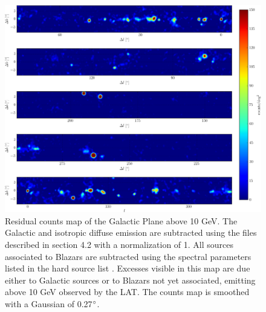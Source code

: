 \begin{figure}[h!]
\centering
\includegraphics[width=\textwidth]{figures/Plan_gal.eps}
\caption{Residual counts map of the Galactic Plane above 10 GeV. The Galactic and isotropic diffuse emission are subtracted using the files described in section 4.2 with a normalization of 1. All sources associated to Blazars are subtracted using the spectral parameters listed in the hard source list \citep{1FHL}. Excesses visible in this map are due either to Galactic sources or to Blazars not yet associated, emitting above 10 GeV observed by the LAT. The counts map is smoothed with a Gaussian of 0.27$\mbox{$^\circ$}$.
\label{fig:PlanGal}}
\end{figure}


